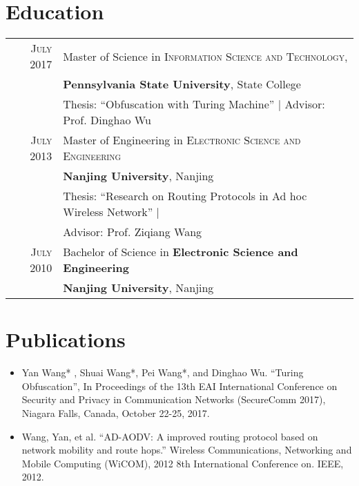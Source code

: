 \documentclass[a4paper,10pt]{article}
\begin{document}
\section{Education}
\begin{tabular}{rl}
 \textsc{July} 2017 & Master of Science in \textsc{Information Science and Technology},\\&\textbf{Pennsylvania State University}, State College\\
& Thesis: ``Obfuscation with Turing Machine'' | \small Advisor: Prof. Dinghao Wu \\
 \textsc{July} 2013& Master of Engineering in \textsc{Electronic Science and Engineering}\\
&\normalsize\textbf{Nanjing University}, Nanjing\\
 & Thesis: ``Research on Routing Protocols in Ad hoc Wireless Network'' | \\
 &\small Advisor: Prof. Ziqiang Wang \\

\textsc{July} 2010& Bachelor of Science in  \textbf{Electronic Science and Engineering}\\
&\normalsize\textbf{Nanjing University}, Nanjing\\
\end{tabular}

\section{Publications}
\begin{itemize}
\item Yan Wang* , Shuai Wang*, Pei Wang*, and Dinghao Wu. ``Turing Obfuscation'', In Proceedings of the 13th EAI International Conference on Security and Privacy in Communication Networks (SecureComm 2017), Niagara Falls, Canada, October 22-25, 2017.\\
\item Wang, Yan, et al. ``AD-AODV: A improved routing protocol based on network mobility and route hops.'' Wireless Communications, Networking and Mobile Computing (WiCOM), 2012 8th International Conference on. IEEE, 2012.
\end{itemize}
\end{document}
